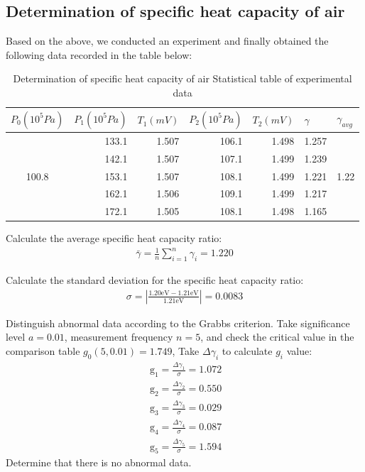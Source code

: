 \documentclass[UTF8]{article}
\begin{document}
	\subsection{Determination of specific heat capacity of air}
	Based on the above, we conducted an experiment and finally obtained the following data recorded in the table below:
	\begin{table}[htbp]
	  \centering
	  \caption{Determination of specific heat capacity of air Statistical table of experimental data}
	    \begin{tabular}{crrrrrc}
	    \toprule[2pt]
	    \multicolumn{1}{l}{$P_0  (10^5 Pa)$} & \multicolumn{1}{l}{$P_1 (10^5 Pa)$} & \multicolumn{1}{l}{$T_1 (mV)$} & \multicolumn{1}{l}{$P_2 (10^5 Pa)$} & \multicolumn{1}{l}{$T_2 (mV)$} & \multicolumn{1}{l}{$\gamma$} & \multicolumn{1}{l}{$\gamma_{avg}$} \\
	    \midrule
	    \multirow{5}[0]{*}{100.8} & 133.1 & 1.507 & 106.1 & 1.498 & 1.257 & \multirow{5}[0]{*}{1.22} \\
	          & 142.1 & 1.507 & 107.1 & 1.499 & 1.239 &  \\
	          & 153.1 & 1.507 & 108.1 & 1.499 & 1.221 &  \\
	          & 162.1 & 1.506 & 109.1 & 1.499 & 1.217 &  \\
	          & 172.1 & 1.505 & 108.1 & 1.498 & 1.165 &  \\
	          \bottomrule[2pt]
	    \end{tabular}%
	  \label{tab:addlabel}%
	\end{table}%
	
	Calculate the average specific heat capacity ratio:
	\begin{eqnarray}
	\bar{\gamma}=\frac{1}{n} \sum_{i=1}^{n} \gamma_{i}=1.220 
	\end{eqnarray}
	
	Calculate the standard deviation for the specific heat capacity ratio:
	\begin{eqnarray}
	\sigma=\left|\frac{1.20 \mathrm{eV}-1.21 \mathrm{eV}}{1.21 \mathrm{eV}}\right|=0.0083
	\end{eqnarray}
	
    Distinguish abnormal data according to the Grabbs criterion. Take significance level $a=0.01$, measurement frequency $n=5$, and check the critical value in the comparison table $g_0(5, 0.01)=1.749$, Take $\Delta γ_i$ to calculate $g_i$ value:
    \begin{eqnarray}
    \mathrm{~g}_{1}=\frac{\Delta \gamma_{1}}{\sigma}=1.072 \\
    \mathrm{~g}_{2}=\frac{\Delta \gamma_{2}}{\sigma}=0.550 \\
    \mathrm{~g}_{3}=\frac{\Delta \gamma_{3}}{\sigma}=0.029 \\
    \mathrm{~g}_{4}=\frac{\Delta \gamma_{4}}{\sigma}=0.087 \\
    \mathrm{~g}_{5}=\frac{\Delta \gamma_{5}}{\sigma}=1.594 
    \end{eqnarray}
    Determine that there is no abnormal data.
    
\end{document}
